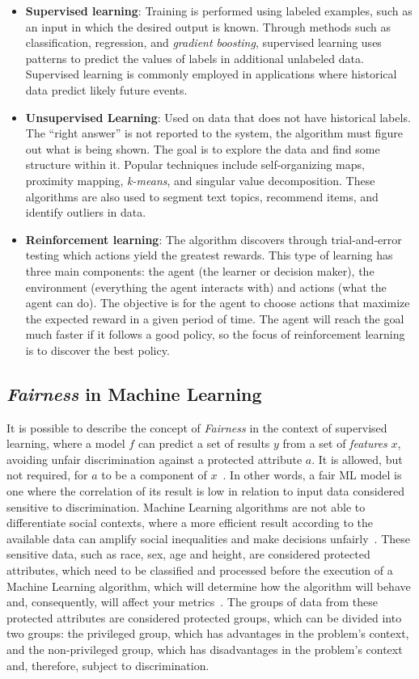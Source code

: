 \documentclass[runningheads]{llncs}
\begin{document}
\begin{itemize}
\item \textbf{Supervised learning}: Training is performed using labeled examples, such as an input in which the desired output is known. Through methods such as classification, regression, and \textit{gradient boosting}, supervised learning uses patterns to predict the values of labels in additional unlabeled data. Supervised learning is commonly employed in applications where historical data predict likely future events.
\item \textbf{Unsupervised Learning}: Used on data that does not have historical labels. The “right answer” is not reported to the system, the algorithm must figure out what is being shown. The goal is to explore the data and find some structure within it. Popular techniques include self-organizing maps, proximity mapping, \textit{k-means}, and singular value decomposition. These algorithms are also used to segment text topics, recommend items, and identify outliers in data.
\item \textbf{Reinforcement learning}: The algorithm discovers through trial-and-error testing which actions yield the greatest rewards. This type of learning has three main components: the agent (the learner or decision maker), the environment (everything the agent interacts with) and actions (what the agent can do). The objective is for the agent to choose actions that maximize the expected reward in a given period of time. The agent will reach the goal much faster if it follows a good policy, so the focus of reinforcement learning is to discover the best policy.
\end{itemize}

\subsection{\textit{Fairness} in Machine Learning}

It is possible to describe the concept of \textit{Fairness} in the context of supervised learning, where a model $f$ can predict a set of results $y$ from a set of \textit{features} $x$, avoiding unfair discrimination against a protected attribute $a$. It is allowed, but not required, for $a$ to be a component of $x$~\citep{Begley_2021}. In other words, a fair ML model is one where the correlation of its result is low in relation to input data considered sensitive to discrimination. Machine Learning algorithms are not able to differentiate social contexts, where a more efficient result according to the available data can amplify social inequalities and make decisions unfairly~\citep{Mehrabi_2021}. These sensitive data, such as race, sex, age and height, are considered protected attributes, which need to be classified and processed before the execution of a Machine Learning algorithm, which will determine how the algorithm will behave and, consequently, will affect your metrics~\citep{Mougan_2022}. The groups of data from these protected attributes are considered protected groups, which can be divided into two groups: the privileged group, which has advantages in the problem's context, and the non-privileged group, which has disadvantages in the problem's context and, therefore, subject to discrimination.
\end{document}
